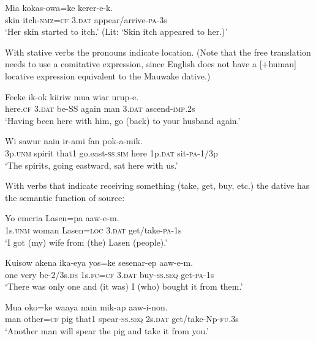 \ea%
\label{ex:x580}
\gll Mia kokas-owa=ke  kerer-e-k. \\
skin itch-\textsc{nmz}=\textsc{cf} 3.\textsc{dat} appear/arrive-\textsc{pa}-3s\\
\glt`Her skin started to itch.' (Lit: `Skin itch appeared to her.)' 
\z

With stative verbs the pronouns indicate location. (Note that the free translation needs to use a comitative expression, since English does not have a [+human] locative expression equivalent to the Mauwake dative.) 

\ea%
\label{ex:x1782}
\gll Feeke  ik-ok kiiriw mua wiar urup-e. \\
here.\textsc{cf} 3.\textsc{dat} be-SS again man 3.\textsc{dat} ascend-\textsc{imp}.2s\\
\glt`Having been here with him, go (back) to your husband again.'
\z

\ea%
\label{ex:x1783}
\gll Wi sawur nain ir-ami fan  pok-a-mik.{\footnotemark} \\
3p.\textsc{unm} spirit that1 go.east-\textsc{ss}.\textsc{sim} here 1p.\textsc{dat} sit-\textsc{pa}-1/3p\\
\glt`The spirits, going eastward, sat here with us.'
\z


With verbs that indicate receiving something (take, get, buy, etc.) the dative has the semantic function of source:

\ea%
\label{ex:x579}
\gll Yo emeria Lasen=pa  aaw-e-m. \\
1s.\textsc{unm} woman Lasen=\textsc{loc} 3.\textsc{dat} get/take-\textsc{pa}-1s\\
\glt`I got (my) wife from (the) Lasen (people).'
\z

\ea%
\label{ex:x1784}
\gll Kuisow akena ika-eya yos=ke  sesenar-ep aaw-e-m. \\
one very be-2/3s.\textsc{ds} 1s.\textsc{fc}=\textsc{cf} 3.\textsc{dat} buy-\textsc{ss}.\textsc{seq} get-\textsc{pa}-1s\\
\glt`There was only one and (it was) I (who) bought it from them.'
\z

\ea%
\label{ex:x1785}
\gll Mua oko=ke waaya nain mik-ap  aaw-i-non. \\
man other=\textsc{cf} pig that1 spear-\textsc{ss}.\textsc{seq} 2s.\textsc{dat} get/take-Np-\textsc{fu}.3s\\
\glt`Another man will spear the pig and take it from you.'
\z


